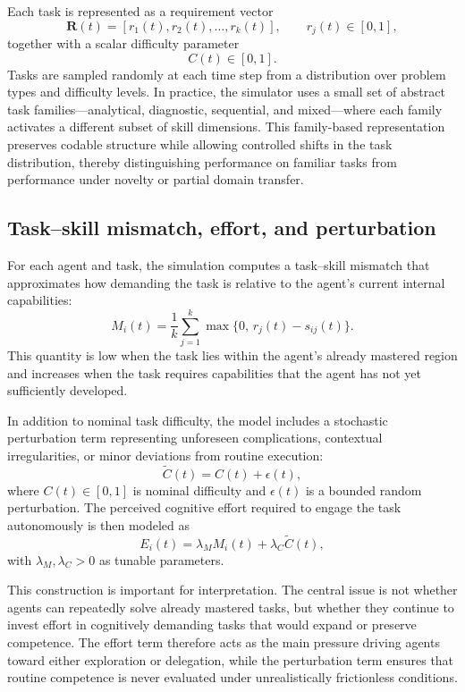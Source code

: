 \documentclass[11pt,a4paper]{article}
\begin{document}
Each task is represented as a requirement vector
\[
\mathbf{R}(t) = \left[r_1(t), r_2(t), \dots, r_k(t)\right], \qquad r_j(t) \in [0,1],
\]
together with a scalar difficulty parameter
\[
C(t) \in [0,1].
\]
Tasks are sampled randomly at each time step from a distribution over problem types and difficulty levels. In practice, the simulator uses a small set of abstract task families---analytical, diagnostic, sequential, and mixed---where each family activates a different subset of skill dimensions. This family-based representation preserves codable structure while allowing controlled shifts in the task distribution, thereby distinguishing performance on familiar tasks from performance under novelty or partial domain transfer.

\subsection{Task--skill mismatch, effort, and perturbation}

For each agent and task, the simulation computes a task--skill mismatch that approximates how demanding the task is relative to the agent's current internal capabilities:
\[
M_i(t) = \frac{1}{k} \sum_{j=1}^{k} \max\{0,\, r_j(t) - s_{ij}(t)\}.
\]
This quantity is low when the task lies within the agent's already mastered region and increases when the task requires capabilities that the agent has not yet sufficiently developed.

In addition to nominal task difficulty, the model includes a stochastic perturbation term representing unforeseen complications, contextual irregularities, or minor deviations from routine execution:
\[
\widetilde{C}(t) = C(t) + \epsilon(t),
\]
where $C(t) \in [0,1]$ is nominal difficulty and $\epsilon(t)$ is a bounded random perturbation. The perceived cognitive effort required to engage the task autonomously is then modeled as
\[
E_i(t) = \lambda_M M_i(t) + \lambda_C \widetilde{C}(t),
\]
with $\lambda_M, \lambda_C > 0$ as tunable parameters.

This construction is important for interpretation. The central issue is not whether agents can repeatedly solve already mastered tasks, but whether they continue to invest effort in cognitively demanding tasks that would expand or preserve competence. The effort term therefore acts as the main pressure driving agents toward either exploration or delegation, while the perturbation term ensures that routine competence is never evaluated under unrealistically frictionless conditions.
\end{document}
